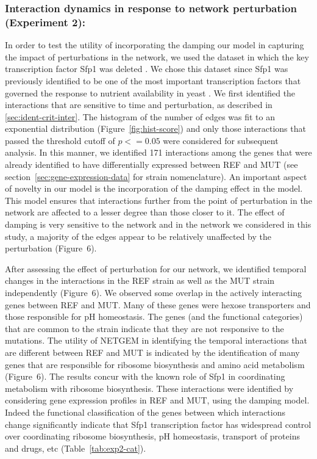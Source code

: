 \documentclass{bioinfo}
\begin{document}
\subsubsection{Interaction dynamics in response to network perturbation (Experiment 2):}
\label{sec:experiment-2}
In order to test the utility of incorporating the damping our model in
capturing the impact of perturbations in the network, we used the
dataset in which the key transcription factor Sfp1 was deleted
\citep{Cipollina2008}. We chose this dataset since Sfp1 was previously
identified to be one of the most important transcription factors that
governed the response to nutrient availability in yeast
\citep{Farzadfard2010}. We first identified the interactions that are
sensitive to time and perturbation, as described in
\ref{sec:ident-crit-inter}. 
The histogram of the number of
edges was fit to an exponential distribution
(Figure~\ref{fig:hist-score}) and only those interactions that passed
the threshold cutoff of $p <= 0.05$ were considered for
subsequent analysis. In this manner, we identified 171 interactions
among the genes that were already identified to have differentially
expressed between REF and MUT (see
section~\ref{sec:gene-expression-data} for strain nomenclature). An
important aspect of novelty in our model is the incorporation of the
damping effect in the model. This model ensures that interactions
further from the point of perturbation in the network are affected to
a lesser degree than those closer to it. The effect of damping is very
sensitive to the network and in the network we considered in this
study, a majority of the edges appear to be relatively unaffected by
the perturbation (Figure~6).


After assessing the effect of perturbation for our network, we
identified temporal changes in the interactions in the REF strain as
well as the MUT strain independently (Figure~6). We observed
some overlap in the actively interacting genes between REF and
MUT. Many of these genes were hexose transporters and those
responsible for pH homeostasis. The genes (and the functional
categories) that are common to the strain indicate that they are not
responsive to the mutations. The utility of NETGEM in identifying the
temporal interactions that are different between REF and MUT is
indicated by the identification of many genes that are responsible for
ribosome biosynthesis and amino acid metabolism (Figure~6). The results concur with the known role of Sfp1 in
coordinating metabolism with ribosome biosynthesis. These interactions
were identified by considering gene expression profiles in REF and
MUT, using the damping model. Indeed the functional classification of
the genes between which interactions change significantly indicate
that Sfp1 transcription factor has widespread control over
coordinating ribosome biosynthesis, pH homeostasis, transport of
proteins and drugs, etc (Table~\ref{tab:exp2-cat}).
\end{document}
